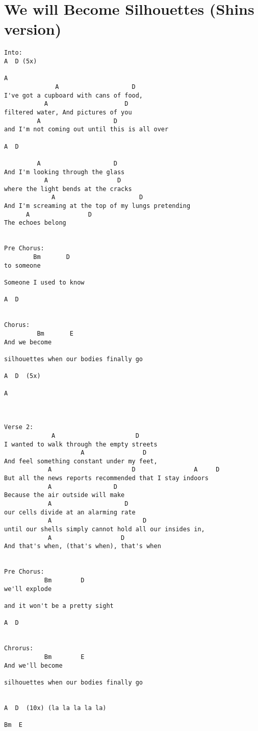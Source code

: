 \documentclass[leqno]{memoir}
\begin{document}
\chapter{We will Become Silhouettes (Shins version)}
\begin{verbatim}
Into:
A  D (5x)

A
              A                    D
I've got a cupboard with cans of food, 
           A                     D
filtered water, And pictures of you 
         A                    D
and I'm not coming out until this is all over

A  D

         A                    D                       
And I'm looking through the glass 
           A                   D
where the light bends at the cracks
             A                       D                  
And I'm screaming at the top of my lungs pretending
      A                D                                       
The echoes belong 


Pre Chorus:
        Bm       D
to someone 
                                                   
Someone I used to know

A  D


Chorus:
         Bm       E
And we become 

silhouettes when our bodies finally go

A  D  (5x)

A



Verse 2:
             A                      D
I wanted to walk through the empty streets
                     A                D
And feel something constant under my feet,
            A                      D                A     D
But all the news reports recommended that I stay indoors
            A                 D
Because the air outside will make 
            A                    D
our cells divide at an alarming rate 
            A                         D
until our shells simply cannot hold all our insides in,
            A                   D
And that's when, (that's when), that's when


Pre Chorus:
           Bm        D
we'll explode

and it won't be a pretty sight

A  D  


Chrorus:
           Bm        E
And we'll become 

silhouettes when our bodies finally go


A  D  (10x) (la la la la la)

Bm  E

\end{verbatim}
\newpage
\end{document}
